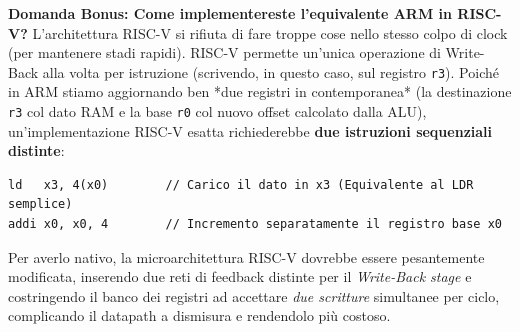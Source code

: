 \documentclass[12pt, a4paper]{article}
\begin{document}
\textbf{Domanda Bonus: Come implementereste l'equivalente ARM in RISC-V?}
L'architettura RISC-V si rifiuta di fare troppe cose nello stesso colpo di clock (per mantenere stadi rapidi). RISC-V permette un'unica operazione di Write-Back alla volta per istruzione (scrivendo, in questo caso, sul registro \texttt{r3}). Poiché in ARM stiamo aggiornando ben *due registri in contemporanea* (la destinazione \texttt{r3} col dato RAM e la base \texttt{r0} col nuovo offset calcolato dalla ALU), un'implementazione RISC-V esatta richiederebbe \textbf{due istruzioni sequenziali distinte}:
\begin{verbatim}
ld   x3, 4(x0)        // Carico il dato in x3 (Equivalente al LDR semplice)
addi x0, x0, 4        // Incremento separatamente il registro base x0
\end{verbatim}
Per averlo nativo, la microarchitettura RISC-V dovrebbe essere pesantemente modificata, inserendo due reti di feedback distinte per il \textit{Write-Back stage} e costringendo il banco dei registri ad accettare \textit{due scritture} simultanee per ciclo, complicando il datapath a dismisura e rendendolo più costoso.
\end{document}
